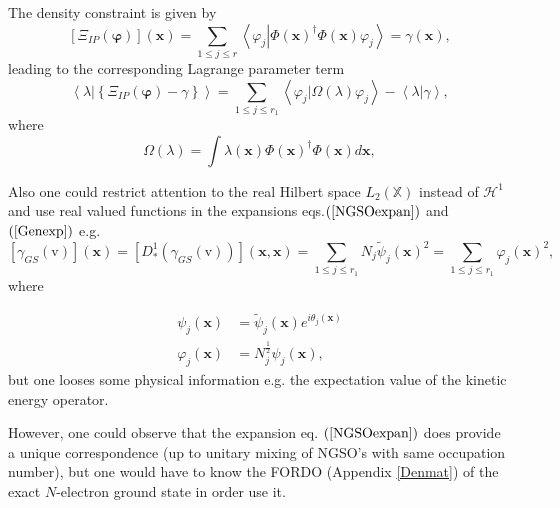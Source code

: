 \documentclass[aps,preprint]{revtex4}%
\begin{document}
The density constraint is given by%
\begin{equation}
\left[  \Xi_{IP}\left(  \mathbf{\varphi}\right)  \right]  \left(
\mathbf{x}\right)  =\sum_{1\leq j\leq r}\left\langle \varphi_{j}\left\vert
\Phi\left(  \mathbf{x}\right)  ^{\dagger}\Phi\left(  \mathbf{x}\right)
\right.  \varphi_{j}\right\rangle =\gamma\left(  \mathbf{x}\right)  ,
\end{equation}
leading to the corresponding Lagrange parameter term
\begin{equation}
\left\langle \left.  \lambda\right\vert \left\{  \Xi_{IP}\left(
\mathbf{\varphi}\right)  -\gamma\right\}  \right\rangle =\sum_{1\leq j\leq
r_{1}}\left\langle \varphi_{j}\left\vert \Omega\left(  \lambda\right)
\right.  \varphi_{j}\right\rangle -\left\langle \left.  \lambda\right\vert
\gamma\right\rangle ,
\end{equation}
where
\begin{equation}
\Omega\left(  \lambda\right)  =\int\lambda\left(  \mathbf{x}\right)
\Phi\left(  \mathbf{x}\right)  ^{\dagger}\Phi\left(  \mathbf{x}\right)
d\mathbf{x,}%
\end{equation}


Also one could restrict attention to the real Hilbert space $L_{2}\left(
\mathbb{X}\right)  $ instead of $\mathcal{H}^{1}$ and use real valued
functions in the expansions eqs.$\left(  \ref{NGSOexpan}\right)  $ and
$\left(  \ref{Genexp}\right)  $ e.g.
\begin{equation}
\left[  \gamma_{GS}\left(  \mathrm{v}\right)  \right]  \left(  \mathbf{x}%
\right)  =\left[  D_{\ast}^{1}\left(  \gamma_{GS}\left(  \mathrm{v}\right)
\right)  \right]  \left(  \mathbf{x,x}\right)  =\sum_{1\leq j\leq r_{1}}%
N_{j}\tilde{\psi}_{j}\left(  \mathbf{x}\right)  ^{2}=\sum_{1\leq j\leq r_{1}%
}\varphi_{j}\left(  \mathbf{x}\right)  ^{2},
\end{equation}
where%

\begin{align}
\psi_{j}\left(  \mathbf{x}\right)   &  =\tilde{\psi}_{j}\left(  \mathbf{x}%
\right)  e^{i\theta_{j}\left(  \mathbf{x}\right)  }\nonumber\\
\varphi_{j}\left(  \mathbf{x}\right)   &  =N_{j}^{\frac{1}{2}}\psi_{j}\left(
\mathbf{x}\right)  ,
\end{align}
but one looses some physical information e.g. the expectation value of the
kinetic energy operator.

However, one could observe that the expansion eq. $\left(  \ref{NGSOexpan}%
\right)  $ does provide a unique correspondence (up to unitary mixing of
NGSO's with same occupation number), but one would have to know the FORDO
(Appendix \ref{Denmat}) of the exact $N$-electron ground state in order use it.
\end{document}

